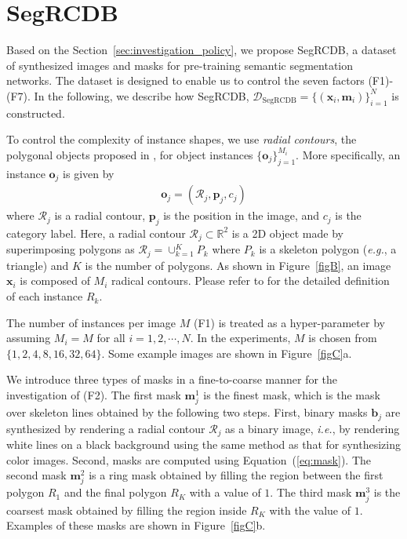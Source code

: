 \documentclass[10pt,twocolumn,letterpaper]{article}
\begin{document}
\def\datasetname{SegRCDB}
\section{\datasetname}
\label{sec:SegRCDB}

Based on the Section~\ref{sec:investigation_policy},
we propose {\datasetname},
a dataset of synthesized images and masks for pre-training semantic segmentation networks.
The dataset is designed to enable us to control the seven factors (F1)-(F7).
In the following, we describe how {\datasetname}, $\mathcal{D}_{\text{\datasetname}} = \{(\bm{x}_{i}, \bm{m}_{i})\}_{i=1}^{N}$ is constructed.

To control the complexity of instance shapes, we use {\it radial contours}, the polygonal objects proposed in \cite{Kataoka_2022_CVPR}, for object instances $\{\bm{o}_{j}\}_{j=1}^{M_{i}}$.
More specifically, an instance $\bm{o}_{j}$ is given by
\begin{align}
\bm{o}_{j} = (\mathcal{R}_{j}, \bm{p}_{j}, c_{j})
\end{align}
where $\mathcal{R}_{j}$ is a radial contour, $\bm{p}_{j}$ is the position in the image, and $c_{j}$ is the category label.
Here, a radial contour $\mathcal{R}_{j}
\subset \mathbb{R}^{2}$ is a 2D object made by superimposing polygons as $\mathcal{R}_{j} = \cup_{k=1}^{K} P_{k}$ where $P_{k}$ is a skeleton polygon ({\it e.g.}, a triangle) and $K$ is the number of polygons.
As shown in Figure~\ref{figB}, an image $\bm{x}_{i}$ is composed of $M_{i}$ radical contours.
Please refer to \cite{Kataoka_2022_CVPR} for the detailed definition of each instance $R_{k}$.

The number of instances per image $M$ (F1) is treated as a hyper-parameter by assuming $M_{i} = M$ for all $i = 1, 2, \cdots, N$.
In the experiments, $M$ is chosen from $\{1, 2, 4, 8, 16, 32, 64\}$.
Some example images are shown in Figure~\ref{figC}a.

We introduce three types of masks in a fine-to-coarse manner for the investigation of (F2).
The first mask $\bm{m}^{1}_{j}$ is the finest mask, which is the mask over skeleton lines obtained by the following two steps.
First, binary masks $\bm{b}_{j}$ are synthesized by rendering a radial contour $\mathcal{R}_{j}$ as a binary image, {\it i.e.}, by rendering white lines on a black background using the same method as that for synthesizing color images.
Second, masks are computed using Equation~(\ref{eq:mask}).
The second mask $\bm{m}^{2}_{j}$  is a ring mask obtained by filling the region between the first polygon $R_{1}$ and the final polygon $R_{K}$ with a value of $1$.
The third mask $\bm{m}^{3}_{j}$ is the coarsest mask obtained by filling the region inside $R_{K}$ with the value of $1$.
Examples of these masks are shown in Figure~\ref{figC}b.
\end{document}
